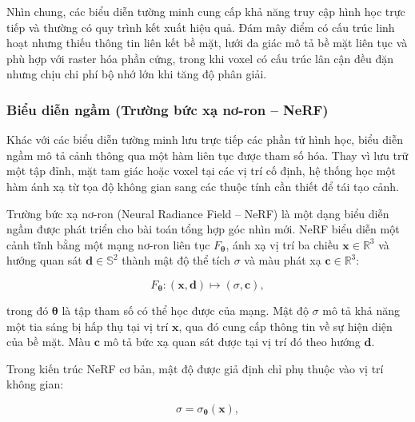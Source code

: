Nhìn chung, các biểu diễn tường minh cung cấp khả năng truy cập hình học trực tiếp và thường có quy trình kết xuất hiệu quả. Đám mây điểm có cấu trúc linh hoạt nhưng thiếu thông tin liên kết bề mặt, lưới đa giác mô tả bề mặt liên tục và phù hợp với raster hóa phần cứng, trong khi voxel có cấu trúc lân cận đều đặn nhưng chịu chi phí bộ nhớ lớn khi tăng độ phân giải.

\subsubsection{Biểu diễn ngầm (Trường bức xạ nơ-ron -- NeRF)}
\label{subsubsec:implicit-nerf-representation}

Khác với các biểu diễn tường minh lưu trực tiếp các phần tử hình học, biểu diễn ngầm mô tả cảnh thông qua một hàm liên tục được tham số hóa. Thay vì lưu trữ một tập đỉnh, mặt tam giác hoặc voxel tại các vị trí cố định, hệ thống học một hàm ánh xạ từ tọa độ không gian sang các thuộc tính cần thiết để tái tạo cảnh.

Trường bức xạ nơ-ron (Neural Radiance Field -- NeRF) \cite{mildenhall2020nerf} là một dạng biểu diễn ngầm được phát triển cho bài toán tổng hợp góc nhìn mới. NeRF biểu diễn một cảnh tĩnh bằng một mạng nơ-ron liên tục $F_{\boldsymbol{\theta}}$, ánh xạ vị trí ba chiều $\mathbf{x}\in\mathbb{R}^{3}$ và hướng quan sát $\mathbf{d}\in\mathbb{S}^{2}$ thành mật độ thể tích $\sigma$ và màu phát xạ $\mathbf{c}\in\mathbb{R}^{3}$:

\begin{equation}
    F_{\boldsymbol{\theta}}
    :
    \left(
        \mathbf{x},
        \mathbf{d}
    \right)
    \longmapsto
    \left(
        \sigma,
        \mathbf{c}
    \right),
    \label{eq:nerf-radiance-field}
\end{equation}

trong đó $\boldsymbol{\theta}$ là tập tham số có thể học được của mạng. Mật độ $\sigma$ mô tả khả năng một tia sáng bị hấp thụ tại vị trí $\mathbf{x}$, qua đó cung cấp thông tin về sự hiện diện của bề mặt. Màu $\mathbf{c}$ mô tả bức xạ quan sát được tại vị trí đó theo hướng $\mathbf{d}$.

Trong kiến trúc NeRF cơ bản, mật độ được giả định chỉ phụ thuộc vào vị trí không gian:

\begin{equation}
    \sigma
    =
    \sigma_{\boldsymbol{\theta}}
    \left(
        \mathbf{x}
    \right),
    \label{eq:nerf-density-function}
\end{equation}


